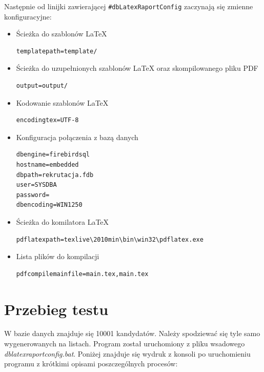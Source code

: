 Następnie od linijki zawierającej \texttt{\#dbLatexRaportConfig} zaczynają się zmienne konfiguracyjne:
  \begin{itemize}
  \item Ścieżka do szablonów LaTeX
   \begin{lstlisting}
templatepath=template/
  \end{lstlisting}
  \item Ścieżka do uzupełnionych szablonów LaTeX oraz skompilowanego pliku PDF
  \begin{lstlisting}
output=output/
 \end{lstlisting}
  \item Kodowanie szablonów LaTeX
   \begin{lstlisting}
encodingtex=UTF-8
  \end{lstlisting}
   \item Konfiguracja połączenia z bazą danych
    \begin{lstlisting}
dbengine=firebirdsql
hostname=embedded
dbpath=rekrutacja.fdb
user=SYSDBA
password=
dbencoding=WIN1250
   \end{lstlisting}
  \item Ścieżka do komilatora LaTeX
   \begin{lstlisting}
pdflatexpath=texlive\2010min\bin\win32\pdflatex.exe
  \end{lstlisting}
    \item Lista plików do kompilacji
 \begin{lstlisting}
pdfcompilemainfile=main.tex,main.tex
\end{lstlisting}
\end{itemize}
\section{Przebieg testu}

W bazie danych znajduje się 10001 kandydatów. Należy spodziewać się tyle samo wygenerowanych na listach.  Program został uruchomiony z pliku wsadowego \emph{dblatexraportconfig.bat}. Poniżej znajduje się wydruk z konsoli po uruchomieniu programu z krótkimi opisami poszczególnych procesów:

